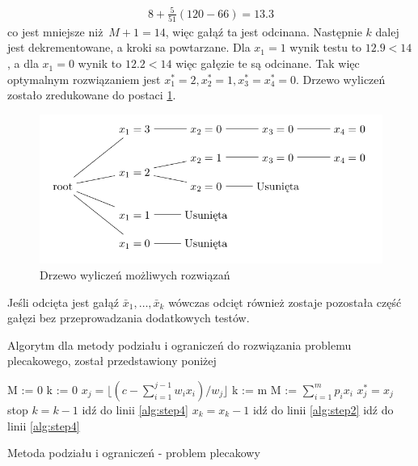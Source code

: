 \begin{equation*}
  \begin{aligned}
    8+\frac{5}{51}(120-66) = 13.3
  \end{aligned}
\end{equation*}
co jest mniejsze niż $M+1 =14$, więc gałąź ta jest odcinana. Następnie $k$ dalej jest dekrementowane, a kroki sa powtarzane. Dla $x_1=1$ wynik testu to $12.9 < 14$, a dla $x_1=0$ wynik to $12.2 < 14$ więc gałęzie te są odcinane. Tak więc optymalnym rozwiązaniem jest  $x_1^* = 2, x_2^*=1, x_3^*=x_4^*=0$. Drzewo wyliczeń zostało zredukowane do postaci \ref{fig:reducedchvatalBBtree}.

\begin{figure}
  \includegraphics[width=\textwidth,center]{../image/reduced_chvatal_book_sample.png}%
  \caption{Drzewo wyliczeń możliwych rozwiązań}
  \label{fig:reducedchvatalBBtree}
\end{figure}

Jeśli odcięta jest gałąź $\bar{x}_1, \dots, \bar{x}_k$ wówczas odcięt również zostaje pozostała część gałęzi bez przeprowadzania dodatkowych testów.

Algorytm dla metody podziału i ograniczeń do rozwiązania problemu plecakowego, został przedstawiony poniżej

\begin{algorithm}
  \begin{algorithmic}[1]
    \State M := 0
    \State k := 0
     \label{alg:step2}
      \State $ x_j = \lfloor{(c - \sum_{i=1}^{j-1}w_ix_i)/w_j}\rfloor$
    \EndFor
    \State k := m
      \State M := $\sum_{i=1}^m p_ix_i$
        \State $x_j^* = x_j$
      \EndFor
    \EndIf
     \label{alg:step4}
      \State stop
    \Else
      \State $k=k-1$
    \EndIf
      \State idź do linii \ref{alg:step4}
    \Else
      \State $x_k = x_k - 1$
    \EndIf
      \State idź do linii \ref{alg:step2}
    \Else
      \State idź do linii \ref{alg:step4}
    \EndIf
  \end{algorithmic}
    \caption{Metoda podziału i ograniczeń - problem plecakowy}
\end{algorithm}

